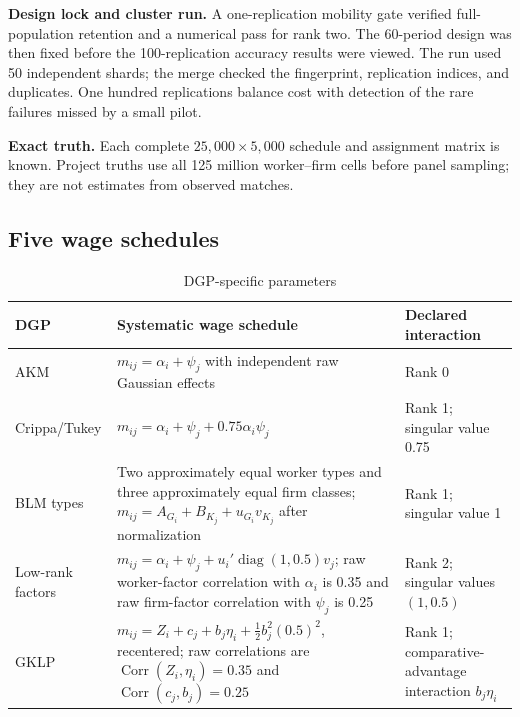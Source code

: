 \documentclass[11pt]{article}
\begin{document}
\textbf{Design lock and cluster run.} A one-replication mobility gate verified
full-population retention and a numerical pass for rank two.  The 60-period
design was then fixed before the 100-replication accuracy results were viewed.
The run used 50 independent shards; the merge checked the fingerprint,
replication indices, and duplicates.  One hundred replications balance cost
with detection of the rare failures missed by a small pilot.

\textbf{Exact truth.} Each complete $25{,}000\times5{,}000$ schedule and
assignment matrix is known.  Project truths use all 125 million worker--firm
cells before panel sampling; they are not estimates from observed matches.

\subsection{Five wage schedules}

\begin{table}[H]
\centering
\caption{DGP-specific parameters}
\label{tab:dgps}
\small
\begin{tabularx}{\textwidth}{>{\raggedright\arraybackslash}p{}
>{\raggedright\arraybackslash}p{}
>{\raggedright\arraybackslash}X}
\toprule
DGP & Systematic wage schedule & Declared interaction \\
\midrule
AKM & $m_{ij}=\alpha_i+\psi_j$ with independent raw Gaussian effects & Rank 0 \cite{akm1999} \\
Crippa/Tukey & $m_{ij}=\alpha_i+\psi_j+0.75\alpha_i\psi_j$ & Rank 1; singular value 0.75 \cite[Sec.~2.2]{crippa2025} \\
BLM types & Two approximately equal worker types and three approximately equal firm classes; $m_{ij}=A_{G_i}+B_{K_j}+u_{G_i}v_{K_j}$ after normalization & Rank 1; singular value 1 \cite{blm2019} \\
Low-rank factors & $m_{ij}=\alpha_i+\psi_j+u_i'\operatorname{diag}(1,0.5)v_j$; raw worker-factor correlation with $\alpha_i$ is 0.35 and raw firm-factor correlation with $\psi_j$ is 0.25 & Rank 2; singular values $(1,0.5)$ \\
GKLP & $m_{ij}=Z_i+c_j+b_j\eta_i+\tfrac12b_j^2(0.5)^2$, recentered; raw correlations are $\operatorname{Corr}(Z_i,\eta_i)=0.35$ and $\operatorname{Corr}(c_j,b_j)=0.25$ & Rank 1; comparative-advantage interaction $b_j\eta_i$ \cite{gklp2002,gklp2005} \\
\bottomrule
\end{tabularx}
\end{table}
\end{document}
